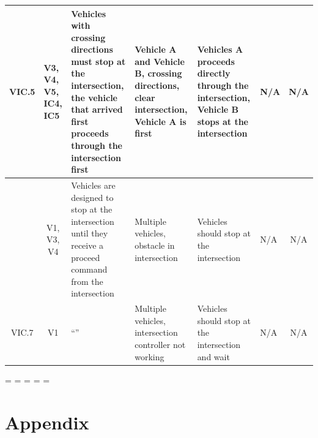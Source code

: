 \documentclass [10pt]{article}
\begin{document}
\begin{longtable}{ | p{ } | p{ } |  p{ } |  p{ } | p{ } | p{ } |  p{ } |}
    \multicolumn{1}{|c|}{VIC.5} 
    &\begin{minipage}{.17\textwidth} \vspace{1 mm} \begin{center}
    V3, V4, V5, IC4, IC5
    \end{center}\end{minipage} 
    & Vehicles with crossing directions must stop at the intersection, the vehicle that arrived first proceeds through the intersection first
    &  Vehicle A and Vehicle B, crossing directions, clear intersection, Vehicle A is first
    &Vehicles A proceeds directly through the intersection, Vehicle B stops at the intersection 
    & N/A 
    & \multicolumn{1}{c|}{N/A}\\ \hline
    
    \rowcolor{tableCell}\multicolumn{1}{|c|}{VIC.6} 
    & \multicolumn{1}{c|}{V1, V3, V4}
    & Vehicles are designed to stop at the intersection until they receive a proceed command from the intersection
    & Multiple vehicles, obstacle in intersection
    & Vehicles should stop at the intersection 
    & N/A 
    & \multicolumn{1}{c|}{N/A}\\  \hline
    
    \multicolumn{1}{|c|}{VIC.7} 
    & \multicolumn{1}{c|}{V1}
    & ``''
    & Multiple vehicles, intersection controller not working
    &  Vehicles should stop at the intersection and wait
    & N/A 
    & \multicolumn{1}{c|}{N/A}\\ \hline
    \end{longtable}



\begin{landscape}
\end{landscape}
\endgroup





    
    
\newpage
\paperwidth=\pdfpageheight
\paperheight=\pdfpagewidth
\pdfpageheight=\paperheight
\pdfpagewidth=\paperwidth
\headwidth=\textwidth



 

\section{Appendix}
\end{document}
